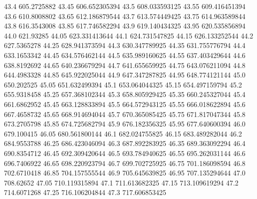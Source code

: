            43.4      605.2725882
          43.45    606.652305394
           43.5    608.033593125
          43.55    609.416451394
           43.6      610.8008802
          43.65    612.186879544
           43.7    613.574449425
          43.75    614.963589844
           43.8      616.3543008
          43.85    617.746582294
           43.9    619.140434325
          43.95    620.535856894
           44.0        621.93285
          44.05    623.331413644
           44.1    624.731547825
          44.15    626.133252544
           44.2      627.5365278
          44.25    628.941373594
           44.3    630.347789925
          44.35    631.755776794
           44.4      633.1653342
          44.45    634.576462144
           44.5    635.989160625
          44.55    637.403429644
           44.6      638.8192692
          44.65    640.236679294
           44.7    641.655659925
          44.75    643.076211094
           44.8      644.4983328
          44.85    645.922025044
           44.9    647.347287825
          44.95    648.774121144
           45.0       650.202525
          45.05    651.632499394
           45.1    653.064044325
          45.15    654.497159794
           45.2      655.9318458
          45.25    657.368102344
           45.3    658.805929425
          45.35    660.245327044
           45.4      661.6862952
          45.45    663.128833894
           45.5    664.572943125
          45.55    666.018622894
           45.6      667.4658732
          45.65    668.914694044
           45.7    670.365085425
          45.75    671.817047344
           45.8      673.2705798
          45.85    674.725682794
           45.9    676.182356325
          45.95    677.640600394
           46.0       679.100415
          46.05    680.561800144
           46.1    682.024755825
          46.15    683.489282044
           46.2      684.9553788
          46.25    686.423046094
           46.3    687.892283925
          46.35    689.363092294
           46.4      690.8354712
          46.45    692.309420644
           46.5    693.784940625
          46.55    695.262031144
           46.6      696.7406922
          46.65    698.220923794
           46.7    699.702725925
          46.75    701.186098594
           46.8      702.6710418
          46.85    704.157555544
           46.9    705.645639825
          46.95    707.135294644
           47.0        708.62652
          47.05    710.119315894
           47.1    711.613682325
          47.15    713.109619294
           47.2      714.6071268
          47.25    716.106204844
           47.3    717.606853425
